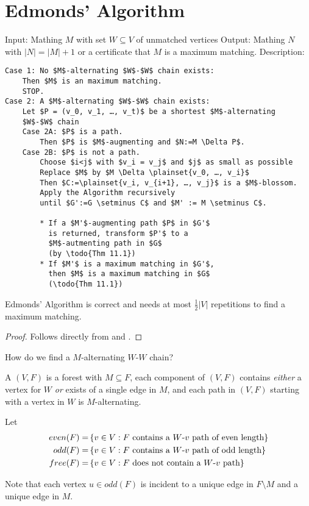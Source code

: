 \section*{Edmonds' Algorithm}
Input: Mathing $M$ with set $W \subseteq V$ of unmatched vertices
Output: Mathing $N$ with $|N| = |M| + 1$ or a certificate that $M$ is a
maximum matching.
Description:
\begin{lstlisting}
Case 1: No $M$-alternating $W$-$W$ chain exists:
	Then $M$ is an maximum matching. 
	STOP.
Case 2: A $M$-alternating $W$-$W$ chain exists:
	Let $P = (v_0, v_1, …, v_t)$ be a shortest $M$-alternating 
	$W$-$W$ chain
	Case 2A: $P$ is a path.
		Then $P$ is $M$-augmenting and $N:=M \Delta P$.
	Case 2B: $P$ is not a path.
		Choose $i<j$ with $v_i = v_j$ and $j$ as small as possible
		Replace $M$ by $M \Delta \plainset{v_0, …, v_i}$
		Then $C:=\plainset{v_i, v_{i+1}, …, v_j}$ is a $M$-blossom.
		Apply the Algorithm recursively 
		until $G':=G \setminus C$ and $M' := M \setminus C$.
		
		* If a $M'$-augmenting path $P$ in $G'$
		  is returned, transform $P'$ to a 
		  $M$-autmenting path in $G$ 
		  (by \todo{Thm 11.1})
		* If $M'$ is a maximum matching in $G'$, 
		  then $M$ is a maximum matching in $G$
		  (\todo{Thm 11.1})
\end{lstlisting}
\begin{thm}
	Edmonds' Algorithm is correct and needs at most $\frac12 |V|$ repetitions to find a maximum matching.
\end{thm}

\begin{proof}
	Follows directly from  and .
\end{proof}

How do we find a $M$-alternating $W$-$W$ chain?
\begin{defn}
	A  $(V,F)$ is a
	forest with $ M \subseteq F$, each component of $(V,F)$ contains 
	\emph{either} a vertex for $W$ \emph{or} exists of a single edge in $M$,
	and each path in $(V,F)$ starting with a vertex in $W$ is 
	$M$-alternating.
	
	Let \begin{align*}
		even(F) =& \left\{ v \in V: F \text{ contains a $W$-$v$ path of even length}\right\} \\
		odd(F) =& \left\{ v \in V: F \text{ contains a $W$-$v$ path of odd length}\right\} \\
		free(F) =& \left\{ v \in V: F \text{ does not contain a $W$-$v$ path}\right\} 
	\end{align*}
	
	
	Note that each vertex $u \in odd(F)$ is incident to a unique edge in
	$F \setminus M$ and a unique edge in $M$.
\end{defn}

